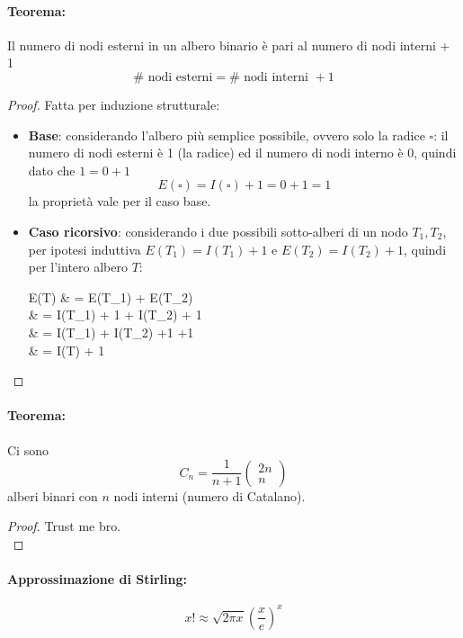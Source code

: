\newpage

\paragraph{Teorema:} Il numero di nodi esterni in un albero binario è pari al numero di nodi interni + 1
$$ \# \text{ nodi esterni} = \# \text{ nodi interni } + 1 $$

\begin{proof}
	Fatta per induzione strutturale:
	\begin{itemize}
		\item \textbf{Base}: considerando l'albero più semplice possibile, ovvero solo la radice $\square$: il numero di nodi esterni è 1 (la radice) ed il numero di nodi interno è $0$, quindi dato che $1 = 0 + 1$
		$$ E(\square) = I(\square) + 1 = 0 + 1 = 1 $$
		la proprietà vale per il caso base.\\
		
		\item \textbf{Caso ricorsivo}: considerando i due possibili sotto-alberi di un nodo $T_1, T_2$, per ipotesi induttiva $E(T_1) = I(T_1) + 1$ e $E(T_2) = I(T_2) + 1$, quindi per l'intero albero $T$:
		\begin{flalign*}
			E(T) & = E(T_1) + E(T_2)  \\
			& = I(T_1) + 1 + I(T_2) + 1 \\
			& = I(T_1) + I(T_2) +1 +1 \\
			& = I(T) + 1
		\end{flalign*}
	\end{itemize}
	
\end{proof}

\paragraph{Teorema:} Ci sono 
$$ C_n = \frac{1}{n+1} 
\left(
\begin{array}{c}
	2n \\ n
\end{array}
\right)
$$
alberi binari con $n$ nodi interni (numero di Catalano).\\

\begin{proof}
	Trust me bro.\\
\end{proof}

\newpage

\paragraph{Approssimazione di Stirling:} 
$$x! \approx \sqrt{2\pi x} \left(\frac{x}{e}\right)^x $$

